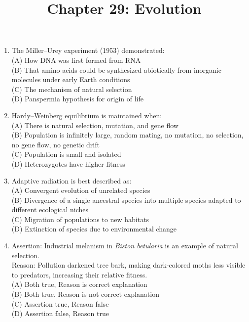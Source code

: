 \documentclass{article}
\begin{document}
\title{Chapter 29: Evolution}
\date{}
\maketitle

\begin{enumerate}[label=Q\arabic*.]

\item The Miller--Urey experiment (1953) demonstrated:
\\(A) How DNA was first formed from RNA
\\(B) That amino acids could be synthesized abiotically from inorganic molecules under early Earth conditions
\\(C) The mechanism of natural selection
\\(D) Panspermia hypothesis for origin of life

\item Hardy--Weinberg equilibrium is maintained when:
\\(A) There is natural selection, mutation, and gene flow
\\(B) Population is infinitely large, random mating, no mutation, no selection, no gene flow, no genetic drift
\\(C) Population is small and isolated
\\(D) Heterozygotes have higher fitness

\item Adaptive radiation is best described as:
\\(A) Convergent evolution of unrelated species
\\(B) Divergence of a single ancestral species into multiple species adapted to different ecological niches
\\(C) Migration of populations to new habitats
\\(D) Extinction of species due to environmental change

\item Assertion: Industrial melanism in \textit{Biston betularia} is an example of natural selection.\\
Reason: Pollution darkened tree bark, making dark-colored moths less visible to predators, increasing their relative fitness.
\\(A) Both true, Reason is correct explanation
\\(B) Both true, Reason is not correct explanation
\\(C) Assertion true, Reason false
\\(D) Assertion false, Reason true


\end{enumerate}
\end{document}
